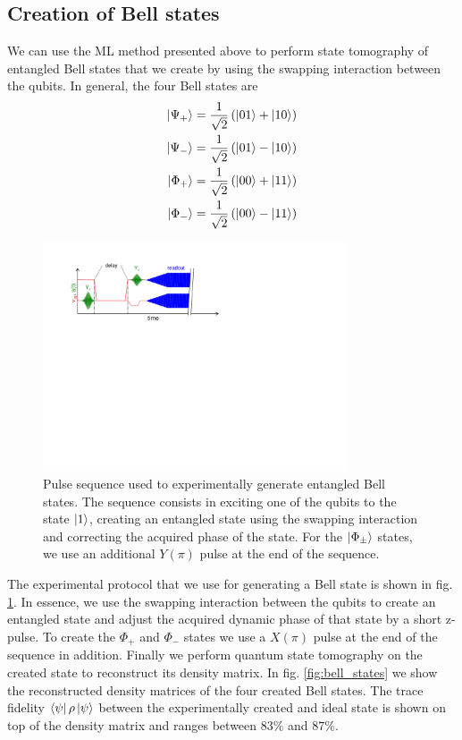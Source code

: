 \subsection{Creation of Bell states}

We can use the ML method presented above to perform state tomography of entangled Bell states that we create by using the swapping interaction between the qubits. In general, the four Bell states are
%
\begin{eqnarray}
\left| \Psi_+ \right> = \frac{1}{\sqrt{2}}\left(\left| 01 \right>+\left| 10 \right>\right) \\
\left| \Psi_- \right> = \frac{1}{\sqrt{2}}\left(\left| 01 \right>-\left| 10 \right>\right) \\
\left| \Phi_+ \right> = \frac{1}{\sqrt{2}}\left(\left| 00 \right>+\left| 11 \right>\right) \\
\left| \Phi_- \right> = \frac{1}{\sqrt{2}}\left(\left| 00 \right>-\left| 11 \right>\right)
\end{eqnarray}
%

\begin{figure}
	\centering
	\includegraphics[width=9cm]{"./material/figures/measurement/bell_state_creation"}
	\caption[]{Pulse sequence used to experimentally generate entangled Bell states. The sequence consists in exciting one of the qubits to the state $\left| 1 \right>$, creating an entangled state using the swapping interaction and correcting the acquired phase of the state. For the $\left| \Phi_\pm \right>$ states, we use an additional $Y(\pi)$ pulse at the end of the sequence.}
	\label{fig:bell_generation_pulse_sequence}
\end{figure}


The experimental protocol that we use for generating a Bell state is shown in fig. \ref{fig:bell_generation_pulse_sequence}. In essence, we use the swapping interaction between the qubits to create an entangled state and adjust the acquired dynamic phase of that state by a short z-pulse. To create the $\Phi_+$ and $\Phi_-$ states we use a $X(\pi)$ pulse at the end of the sequence in addition. Finally we perform quantum state tomography on the created state to reconstruct its density matrix. In fig. \ref{fig:bell_states} we show the reconstructed density matrices of the four created Bell states. The trace fidelity $\left< \psi \right|\rho\left| \psi \right>$ between the experimentally created and ideal state is shown on top of the density matrix and ranges between $83 \%$ and $87 \%$.

